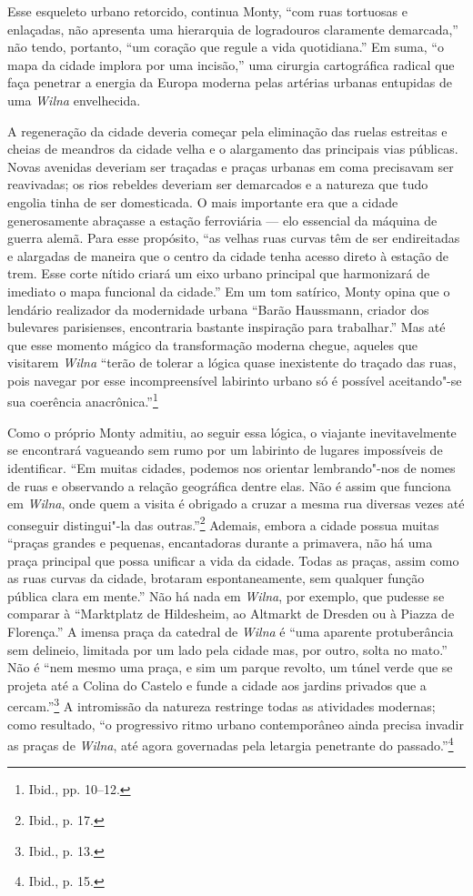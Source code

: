 Esse esqueleto urbano retorcido, continua Monty, ``com ruas tortuosas e
enlaçadas, não apresenta uma hierarquia de logradouros claramente
demarcada,'' não tendo, portanto, ``um coração que regule a vida
quotidiana.'' Em suma, ``o mapa da cidade implora por uma incisão,'' uma
cirurgia cartográfica radical que faça penetrar a energia da Europa
moderna pelas artérias urbanas entupidas de uma \textit{Wilna} envelhecida.

A regeneração da cidade deveria começar pela eliminação das ruelas
estreitas e cheias de meandros da cidade velha e o alargamento das
principais vias públicas. Novas avenidas deveriam ser traçadas e praças
urbanas em coma precisavam ser reavivadas; os rios rebeldes deveriam ser
demarcados e a natureza que tudo engolia tinha de ser domesticada. O
mais importante era que a cidade generosamente abraçasse a estação
ferroviária --- elo essencial da máquina de guerra alemã. Para esse
propósito, ``as velhas ruas curvas têm de ser endireitadas e alargadas
de maneira que o centro da cidade tenha acesso direto à estação de trem.
Esse corte nítido criará um eixo urbano principal que harmonizará de
imediato o mapa funcional da cidade.'' Em um tom satírico, Monty opina
que o lendário realizador da modernidade urbana ``Barão Haussmann,
criador dos bulevares parisienses, encontraria bastante inspiração para
trabalhar.'' Mas até que esse momento mágico da transformação moderna
chegue, aqueles que visitarem \textit{Wilna} ``terão de tolerar a lógica quase
inexistente do traçado das ruas, pois navegar por esse incompreensível
labirinto urbano só é possível aceitando"-se sua coerência
anacrônica.''\footnote{Ibid., pp. 10--12.}

Como o próprio Monty admitiu, ao seguir essa lógica, o viajante
inevitavelmente se encontrará vagueando sem rumo por um labirinto de
lugares impossíveis de identificar. ``Em muitas cidades, podemos nos
orientar lembrando"-nos de nomes de ruas e observando a relação
geográfica dentre elas. Não é assim que funciona em \textit{Wilna}, onde quem a
visita é obrigado a cruzar a mesma rua diversas vezes até conseguir
distingui"-la das outras.''\footnote{Ibid., p. 17.} Ademais, embora a
cidade possua muitas ``praças grandes e pequenas, encantadoras durante a
primavera, não há uma praça principal que possa unificar a vida da
cidade. Todas as praças, assim como as ruas curvas da cidade, brotaram
espontaneamente, sem qualquer função pública clara em mente.'' Não há
nada em \textit{Wilna}, por exemplo, que pudesse se comparar à ``Marktplatz de
Hildesheim, ao Altmarkt de Dresden ou à Piazza de Florença.'' A imensa
praça da catedral de \textit{Wilna} é ``uma aparente protuberância sem delineio,
limitada por um lado pela cidade mas, por outro, solta no mato.'' Não é
``nem mesmo uma praça, e sim um parque revolto, um túnel verde que se
projeta até a Colina do Castelo e funde a cidade aos jardins privados
que a cercam.''\footnote{Ibid., p. 13.} A intromissão da natureza
restringe todas as atividades modernas; como resultado, ``o progressivo
ritmo urbano contemporâneo ainda precisa invadir as praças de \textit{Wilna}, até
agora governadas pela letargia penetrante do passado.''\footnote{Ibid., p. 15.}

